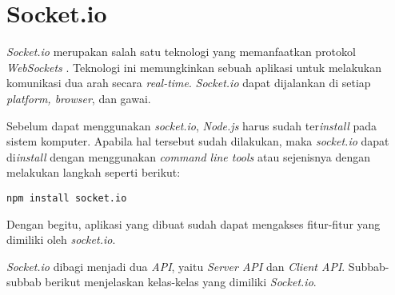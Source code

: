 %
%
%	
%	
%	


\section{Socket.io}
\label{sec:Socket.io}

\textit{Socket.io} merupakan salah satu teknologi yang memanfaatkan protokol \textit{WebSockets} \cite{socketio}. Teknologi ini memungkinkan sebuah aplikasi untuk melakukan komunikasi dua arah secara \textit{real-time}. \textit{Socket.io} dapat dijalankan di setiap \textit{platform, browser}, dan gawai.

Sebelum dapat menggunakan \textit{socket.io}, \textit{Node.js} harus sudah ter\textit{install} pada sistem komputer. Apabila hal tersebut sudah dilakukan, maka \textit{socket.io} dapat di\textit{install} dengan menggunakan \textit{command line tools} atau sejenisnya dengan melakukan langkah seperti berikut:
\begin{lstlisting}
npm install socket.io
\end{lstlisting}

Dengan begitu, aplikasi yang dibuat sudah dapat mengakses fitur-fitur yang dimiliki oleh \textit{socket.io}.

\textit{Socket.io} dibagi menjadi dua \textit{API}, yaitu \textit{Server API} dan \textit{Client API}. Subbab-subbab berikut menjelaskan kelas-kelas yang dimiliki \textit{Socket.io}.

